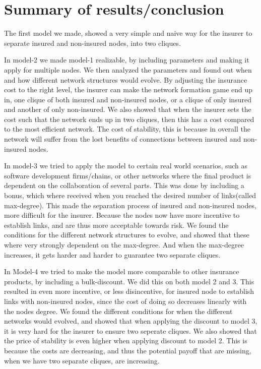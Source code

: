 \chapter{Summary of results/conclusion}


The first model we made, showed a very simple and naive way for the insurer to separate insured and non-insured nodes, into two cliques. 

 In model-2 we made model-1 realizable, by including parameters and making it apply for multiple nodes. We then analyzed the parameters and found out when and how different network structures would evolve. By adjusting the insurance cost to the right level, the insurer can make the network formation game end up in, one clique of both insured and non-insured nodes, or a clique of only insured and another of only non-insured. 
We also showed that when the insurer sets the cost such that the network ends up in two cliques, then this has a cost compared to the most efficient network. The cost of stability, this is because in overall the network will suffer from the lost benefits of connections between insured and non-insured nodes.

In model-3 we tried to apply the model to certain real world scenarios, such as software development firms/chains, or other networks where the final product is dependent on the collaboration of several parts.
This was done by including a bonus, which where received when you reached the desired number of links(called max-degree). This made the separation process of insured and non-insured nodes, more difficult for the insurer. Because the nodes now have more incentive to establish links, and are thus more acceptable towards risk. We found the conditions for the different network structures to evolve, and showed that these where very strongly dependent on the max-degree. And when the max-degree increases, it gets harder and harder to guarantee two separate cliques. 


In Model-4 we tried to make the model more comparable to other insurance products, by including a bulk-discount. We did this on both model 2 and 3. This resulted in even more incentive, or less disincentive, for insured node to establish links with non-insured nodes, since the cost of doing so decreases linearly with the nodes degree. 
We found the different conditions for when the different networks would evolved, and showed that when applying the discount to model 3, it is very hard for the insurer to ensure two seperate cliques. 
We also showed that the price of stability is even higher when applying discount to model 2. This is because the costs are decreasing, and thus the potential payoff that are missing, when we have two separate cliques, are increasing. 


